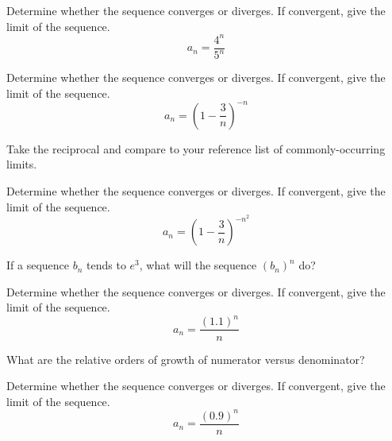 \documentclass{ximera}
\begin{document}
\begin{exercise}%
Determine whether the sequence converges or diverges. If convergent, give the limit of the sequence. 
\[ a_n = \frac{4^n}{5^n} \]
\begin{multipleChoice}
\end{multipleChoice}
\end{exercise}

\begin{exercise}
Determine whether the sequence converges or diverges. If convergent, give the limit of the sequence. 
\[ a_n = \left(1 - \frac{3}{n} \right)^{-n} \]
\begin{multipleChoice}
\end{multipleChoice}
\begin{hint}
Take the reciprocal and compare to your reference list of commonly-occurring limits.
\end{hint}
\end{exercise}

\begin{exercise}
Determine whether the sequence converges or diverges. If convergent, give the limit of the sequence. 
\[ a_n = \left(1 - \frac{3}{n}\right)^{-n^2} \]
\begin{multipleChoice}
\end{multipleChoice}
\begin{hint}
If a sequence $b_n$ tends to $e^3$, what will the sequence $(b_n)^n$ do?
\end{hint}
\end{exercise}

\begin{exercise}
Determine whether the sequence converges or diverges. If convergent, give the limit of the sequence. 
\[ a_n = \frac{(1.1)^n}{n} \]
\begin{multipleChoice}
\end{multipleChoice}
\begin{hint}
What are the relative orders of growth of numerator versus denominator?
\end{hint}
\end{exercise}

\begin{exercise}
Determine whether the sequence converges or diverges. If convergent, give the limit of the sequence. 
\[ a_n = \frac{(0.9)^n}{n} \]
\begin{multipleChoice}
\end{multipleChoice}
\end{exercise}
\end{document}
